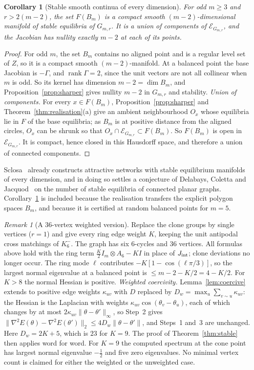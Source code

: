\documentclass[11pt,a4paper]{article}
\newtheorem{corollary}[theorem]{Corollary}
\theoremstyle{definition}\newtheorem{conjecture}{Conjecture}
\theoremstyle{remark}\newtheorem{remark}[theorem]{Remark}
\newcommand{\E}{\mathcal E}
\DeclareMathOperator{\rank}{rank}
\begin{document}
\begin{corollary}[Stable smooth continua of every dimension]\label{cor:smooth}
For odd $m\ge3$ and $r>2(m-2)$, the set $F(B_m)$ is a compact smooth $(m-2)$-dimensional manifold of stable equilibria of $G_{m,r}$. It is a union of components of $\E_{G_{m,r}}$, and the Jacobian has nullity exactly $m-2$ at each of its points.
\end{corollary}
\begin{proof}
For odd $m$, the set $B_m$ contains no aligned point and is a regular level set of $Z$, so it is a compact smooth $(m-2)$-manifold. At a balanced point the base Jacobian is $-\Gamma$, and $\rank\Gamma=2$, since the unit vectors are not all collinear when $m$ is odd. So its kernel has dimension $m-2=\dim B_m$, and Proposition~\ref{prop:sharper} gives nullity $m-2$ in $G_{m,r}$ and stability. \emph{Union of components.} For every $x\in F(B_m)$, Proposition~\ref{prop:sharper} and Theorem~\ref{thm:realisation}(a) give an ambient neighbourhood $O_x$ whose equilibria lie in $F$ of the base equilibria; as $B_m$ is at positive distance from the aligned circles, $O_x$ can be shrunk so that $O_x\cap\E_{G_{m,r}}\subset F(B_m)$. So $F(B_m)$ is open in $\E_{G_{m,r}}$. It is compact, hence closed in this Hausdorff space, and therefore a union of connected components.
\end{proof}
Sclosa~\cite{sclosa23} already constructs attractive networks with stable equilibrium manifolds of every dimension, and in doing so settles a conjecture of Delabays, Coletta and Jacquod~\cite{dcj} on the number of stable equilibria of connected planar graphs. Corollary~\ref{cor:smooth} is included because the realisation transfers the explicit polygon spaces $B_m$, and because it is certified at random balanced points for $m=5$.

\begin{remark}[A 36-vertex weighted version]\label{rem:weighted}
Replace the clone groups by single vertices ($r=1$) and give every ring edge weight $K$, keeping the unit antipodal cross matchings of $K_6^-$. The graph has six $6$-cycles and 36 vertices. All formulas above hold with the ring term $\tfrac K2 I_m\otimes A_6-KI$ in place of $J_{\rm int}$; clone deviations no longer occur. The ring mode $\ell$ contributes $-K[1-\cos(\ell\pi/3)]$, so the largest normal eigenvalue at a balanced point is $\le m-2-K/2=4-K/2$. For $K>8$ the normal Hessian is positive. \emph{Weighted coercivity.} Lemma~\ref{lem:coercive} extends to positive edge weights $\kappa_{uv}$ with $D$ replaced by $D_w=\max_u\sum_{v\sim u}\kappa_{uv}$: the Hessian is the Laplacian with weights $\kappa_{uv}\cos(\theta_v-\theta_u)$, each of which changes by at most $2\kappa_{uv}\|\theta-\theta'\|_\infty$, so Step~2 gives $\|\nabla^2E(\theta)-\nabla^2E(\theta')\|_2\le4D_w\|\theta-\theta'\|$, and Steps~1 and~3 are unchanged. Here $D_w=2K+5$, which is $23$ for $K=9$. The proof of Theorem~\ref{thm:stable} then applies word for word. For $K=9$ the computed spectrum at the cone point has largest normal eigenvalue $-\tfrac12$ and five zero eigenvalues. No minimal vertex count is claimed for either the weighted or the unweighted case.
\end{remark}
\end{document}
